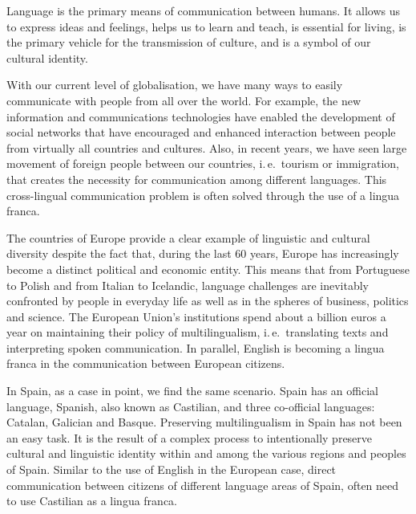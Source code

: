 
\begin{multicols}{2}
    
Language is the primary means of communication between humans. It allows us to express ideas and feelings, helps us to learn and teach, is essential for living, is the primary vehicle for the transmission of culture, and is a symbol of our cultural identity.


With our current level of globalisation, we have many ways to easily communicate with people from all over the world. For example, the new information and communications technologies have enabled the development of social networks that have encouraged and enhanced   interaction between people from virtually all countries and cultures. Also, in recent years, we have seen large movement of foreign people between our countries, i.\,e.~tourism or immigration, that creates the necessity for communication among different languages. This cross-lingual communication problem is often solved through the use of a lingua franca.

The countries of Europe provide a clear example of linguistic and cultural diversity despite the fact that, during the last 60 years, Europe has increasingly become a distinct political and economic entity. This means that from Portuguese to Polish and from Italian to Icelandic, language challenges are inevitably confronted by people in everyday life as well as in the spheres of business, politics and science. The European Union’s institutions spend about a billion euros a year on maintaining their policy of multilingualism, i.\,e.~translating texts and interpreting spoken communication. In parallel, English is becoming a lingua franca in the communication between European citizens.

In Spain, as a case in point, we find the same scenario. Spain has an official language, Spanish, also known as Castilian, and three co-official languages: Catalan, Galician and Basque. Preserving multilingualism in Spain has not been an easy task. It is the result of a complex process to intentionally preserve cultural and linguistic identity within and among the various regions and peoples of Spain. Similar to the use of English in the European case, direct communication between citizens of different language areas of Spain, often need to use Castilian as a lingua franca.


\end{multicols}
